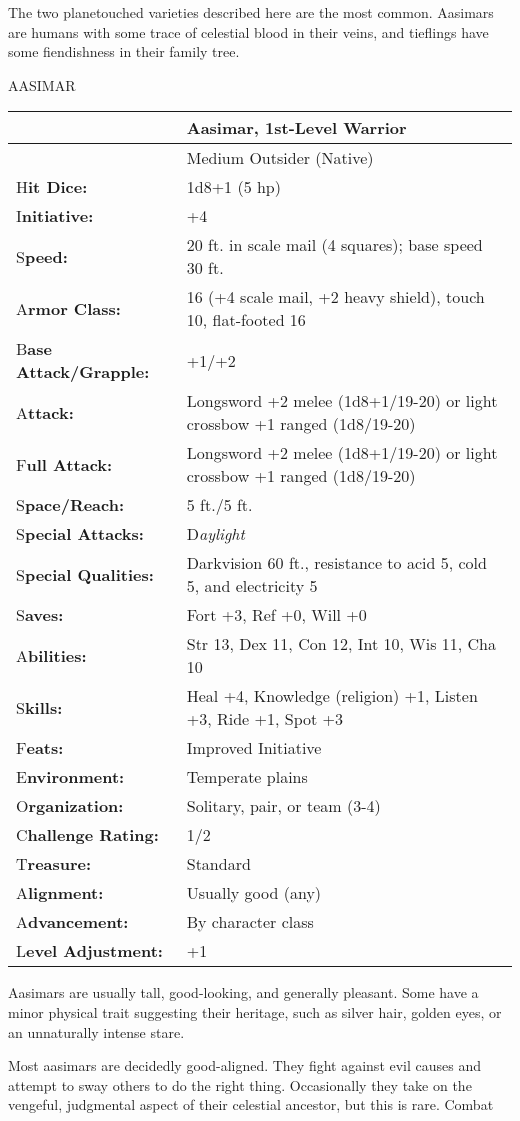 \documentclass{article}
\begin{document}
The two planetouched varieties described here are the most common. Aasimars are 
humans with some trace of celestial blood in their veins, and tieflings have some 
fiendishness in their family tree.

AASIMAR

\begin{tabular}{|>{\raggedright}p{74pt}|>{\raggedright}p{251pt}|}
\hline
  & Aasimar, 1st-Level Warrior\tabularnewline
\hline
  & Medium Outsider (Native)\tabularnewline
\hline
H\textbf{it Dice:} & 1d8+1 (5 hp)\tabularnewline
\hline
I\textbf{nitiative:} & +4\tabularnewline
\hline
S\textbf{peed:} & 20 ft. in scale mail (4 squares); base speed 30 ft.\tabularnewline
\hline
A\textbf{rmor Class:} & 16 (+4 scale mail, +2 heavy shield), touch 10, flat-footed 
16\tabularnewline
\hline
B\textbf{ase Attack/Grapple:} & +1/+2\tabularnewline
\hline
A\textbf{ttack:} & Longsword +2 melee (1d8+1/19-20) or light crossbow +1 ranged 
(1d8/19-20)\tabularnewline
\hline
F\textbf{ull Attack:} & Longsword +2 melee (1d8+1/19-20) or light crossbow +1 ranged 
(1d8/19-20)\tabularnewline
\hline
S\textbf{pace/Reach:} & 5 ft./5 ft.\tabularnewline
\hline
S\textbf{pecial Attacks:} & D\textit{aylight}\tabularnewline
\hline
S\textbf{pecial Qualities:} & Darkvision 60 ft., resistance to acid 5, cold 5, 
and electricity 5\tabularnewline
\hline
S\textbf{aves:} & Fort +3, Ref +0, Will +0\tabularnewline
\hline
A\textbf{bilities:} & Str 13, Dex 11, Con 12, Int 10, Wis 11, Cha 10\tabularnewline
\hline
S\textbf{kills:} & Heal +4, Knowledge (religion) +1, Listen +3, Ride +1, Spot +3\tabularnewline
\hline
F\textbf{eats:} & Improved Initiative\tabularnewline
\hline
E\textbf{nvironment:} & Temperate plains\tabularnewline
\hline
O\textbf{rganization:} & Solitary, pair, or team (3-4)\tabularnewline
\hline
C\textbf{hallenge Rating:} & 1/2\tabularnewline
\hline
T\textbf{reasure:} & Standard\tabularnewline
\hline
A\textbf{lignment:} & Usually good (any)\tabularnewline
\hline
A\textbf{dvancement:} & By character class\tabularnewline
\hline
L\textbf{evel Adjustment:} & +1\tabularnewline
\hline
\end{tabular}

\vspace{12pt}
Aasimars are usually tall, good-looking, and generally pleasant. Some have a minor 
physical trait suggesting their heritage, such as silver hair, golden eyes, or 
an unnaturally intense stare.

Most aasimars are decidedly good-aligned. They fight against evil causes and attempt 
to sway others to do the right thing. Occasionally they take on the vengeful, judgmental 
aspect of their celestial ancestor, but this is rare. Combat
\end{document}
